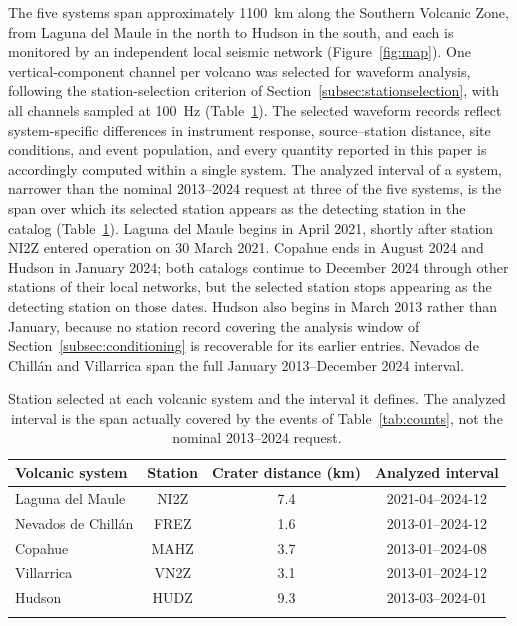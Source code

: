 \documentclass[pdflatex,sn-mathphys-num]{sn-jnl}
\begin{document}
The five systems span approximately 1100~km along the Southern Volcanic
Zone, from Laguna del Maule in the north to Hudson in the south, and each is
monitored by an independent local seismic network (Figure~\ref{fig:map}). One
vertical-component channel per volcano was selected for waveform analysis,
following the station-selection criterion of
Section~\ref{subsec:stationselection}, with all channels sampled at 100~Hz
(Table~\ref{tab:stations}). The selected waveform records reflect system-specific differences in
instrument response, source--station distance, site conditions, and event
population, and every quantity reported in this paper is accordingly
computed within a single system. The analyzed interval of a system, narrower
than the nominal 2013--2024 request at three of the five systems, is the
span over which its selected station appears as the detecting station in the
catalog (Table~\ref{tab:stations}). Laguna del Maule begins in
April 2021, shortly after station NI2Z entered operation on 30 March 2021.
Copahue ends in August 2024 and Hudson in January 2024; both catalogs continue
to December 2024 through other stations of their local networks, but the
selected station stops appearing as the detecting station on those dates.
Hudson also begins in March 2013 rather than January, because no station record
covering the analysis window of Section~\ref{subsec:conditioning} is
recoverable for its earlier entries. Nevados de Chill\'an and Villarrica span
the full January 2013--December 2024 interval.

\begin{table}[h]
\caption{Station selected at each volcanic system and the interval it defines. The analyzed interval is the span actually covered by the events of Table~\ref{tab:counts}, not the nominal 2013--2024 request.}\label{tab:stations}
\begin{tabular}{@{}lccc@{}}
\toprule
Volcanic system & Station & Crater distance (km) & Analyzed interval \\
\midrule
Laguna del Maule      & NI2Z & 7.4 & 2021-04--2024-12 \\
Nevados de Chill\'an  & FREZ & 1.6 & 2013-01--2024-12 \\
Copahue               & MAHZ & 3.7 & 2013-01--2024-08 \\
Villarrica            & VN2Z & 3.1 & 2013-01--2024-12 \\
Hudson                & HUDZ & 9.3 & 2013-03--2024-01 \\
\botrule
\end{tabular}
\end{table}
\end{document}
